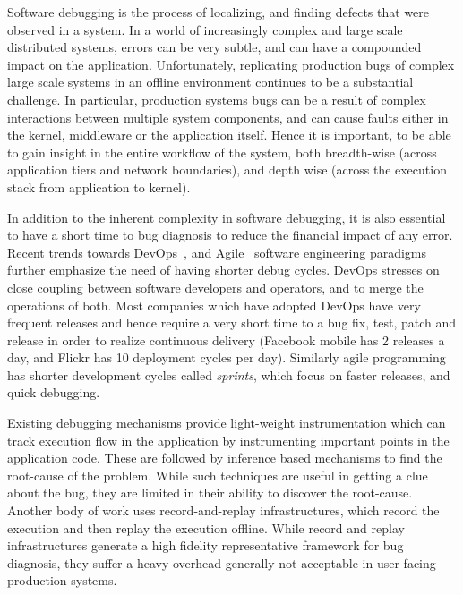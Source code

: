 Software debugging is the process of localizing, and finding defects that were observed in a system.
In a world of increasingly complex and large scale distributed systems, errors can be very subtle, and can have a compounded impact on the application.
Unfortunately, replicating production bugs of complex large scale systems in an offline environment continues to be a substantial challenge.
In particular, production systems bugs can be a result of complex interactions between multiple system components, and can cause faults either in the kernel, middleware or the application itself.
Hence it is important, to be able to gain insight in the entire workflow of the system, both breadth-wise (across application tiers and network boundaries), and depth wise (across the execution stack from application to kernel).

In addition to the inherent complexity in software debugging, it is also essential to have a short time to bug diagnosis to reduce the financial impact of any error.
Recent trends towards DevOps~\cite{devops}, and Agile~\cite{agile} software engineering paradigms further emphasize the need of having shorter debug cycles.
DevOps stresses on close coupling between software developers and operators, and to merge the operations of both.
Most companies which have adopted DevOps have very frequent releases and hence require a very short time to a bug fix, test, patch and release in order to realize continuous delivery (Facebook mobile has 2 releases a day, and Flickr has 10 deployment cycles per day).
Similarly agile programming has shorter development cycles called \textit{sprints}, which focus on faster releases, and quick debugging.

Existing debugging mechanisms provide light-weight instrumentation which can track execution flow in the application by instrumenting important points in the application code.
These are followed by inference based mechanisms to find the root-cause of the problem.
While such techniques are useful in getting a clue about the bug, they are limited in their ability to discover the root-cause.
Another body of work uses record-and-replay infrastructures, which record the execution and then replay the execution offline.
While record and replay infrastructures generate a high fidelity representative framework for bug diagnosis, they suffer a heavy overhead generally not acceptable in user-facing production systems.

